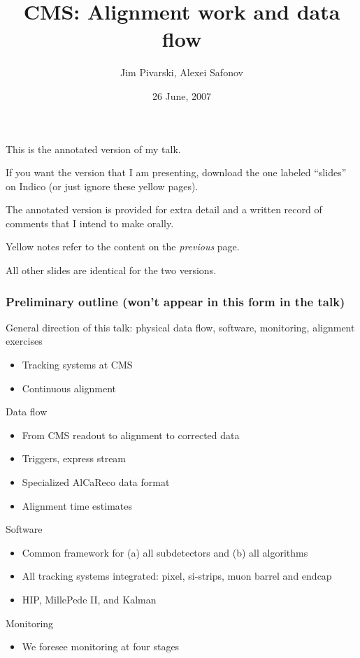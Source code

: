 \documentclass[compress]{beamer}
\title{CMS: Alignment work and data flow}
\author{Jim Pivarski, Alexei Safonov}
\institute{Texas A\&M University}
\date{26 June, 2007}
\begin{document}
\frame{\titlepage}

\begin{notes}
\item This is the annotated version of my talk.
\item If you want the version that I am presenting, download the one
labeled ``slides'' on Indico (or just ignore these yellow pages).
\item The annotated version is provided for extra detail and a written
record of comments that I intend to make orally.
\item Yellow notes refer to the content on the {\it previous} page.
\item All other slides are identical for the two versions.
\end{notes}

\begin{notes}
\frametitle{Preliminary outline (won't appear in this form in the talk)}
\item \tiny General direction of this talk: physical data flow, software, monitoring, alignment exercises
\begin{itemize}
    \item \tiny Tracking systems at CMS
    \item \tiny Continuous alignment
\end{itemize}
\item \tiny Data flow
\begin{itemize}
    \item \tiny From CMS readout to alignment to corrected data
    \item \tiny Triggers, express stream
    \item \tiny Specialized AlCaReco data format
    \item \tiny Alignment time estimates
\end{itemize}
\item \tiny Software
\begin{itemize}
    \item \tiny Common framework for (a) all subdetectors and (b) all algorithms
    \item \tiny All tracking systems integrated: pixel, si-strips, muon barrel and endcap
    \item \tiny HIP, MillePede II, and Kalman
\end{itemize}
\item \tiny Monitoring
\begin{itemize}
    \item \tiny We foresee monitoring at four stages

\end{itemize}
\end{notes}
\end{document}
